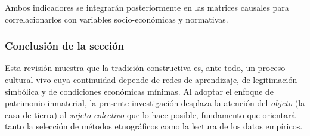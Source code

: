 Ambos indicadores se integrarán posteriormente en las matrices causales
para correlacionarlos con variables socio-económicas y normativas.

\subsubsection{Conclusión de la sección}

Esta revisión muestra que la tradición constructiva es,
ante todo, un proceso cultural vivo cuya continuidad depende de redes de
aprendizaje, de legitimación simbólica y de condiciones económicas
mínimas.  Al adoptar el enfoque de patrimonio inmaterial, la presente
investigación desplaza la atención del \emph{objeto} (la casa de tierra)
al \emph{sujeto colectivo} que lo hace posible, fundamento que
orientará tanto la selección de métodos etnográficos como la lectura de
los datos empíricos.
